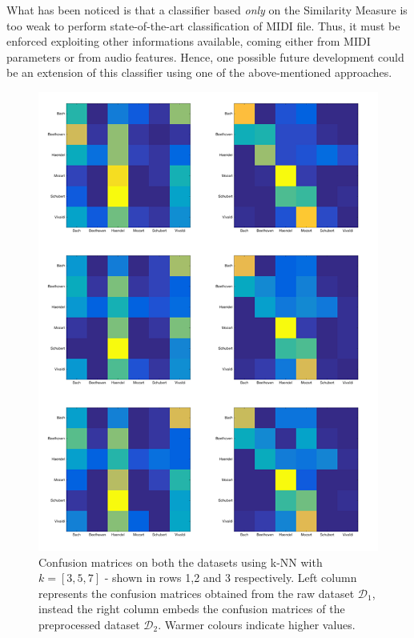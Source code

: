 \documentclass[a4paper]{article}
\begin{document}
	What has been noticed is that a classifier based \textit{only} on the Similarity Measure is too weak to perform state-of-the-art classification of MIDI file. Thus, it must be enforced exploiting other informations available, coming either from MIDI parameters or from audio features. Hence, one possible future development could be an extension of this classifier using one of the above-mentioned approaches.

	\begin{figure}[!ht]
		\centering
		\label{fig:cm}
		\includegraphics[scale=0.54]{misc/collage_dim.png}
		\caption{Confusion matrices on both the datasets using k-NN with $k = \left[3,5,7\right]$ - shown in rows 1,2 and 3 respectively. Left column represents the confusion matrices obtained from the raw dataset $\mathcal{D}_1$, instead the right column embeds the confusion matrices of the preprocessed dataset $\mathcal{D}_2$. Warmer colours indicate higher values.}
	\end{figure}
	
\end{document}
